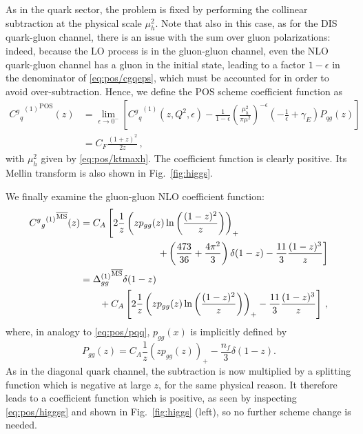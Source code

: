 As in the quark sector, the problem is fixed by performing the
collinear subtraction at the physical scale $\mu_h^2$. Note that
also in this case, as for the DIS quark-gluon channel,
there is an issue with the sum over gluon polarizations: indeed,
because the LO process is in the gluon-gluon channel, even the NLO
quark-gluon channel has a gluon in the initial state, leading
to a factor  $1-\epsilon$ in the 
denominator of \cref{eq:pos/cgqeps}, which must be accounted for in
order to avoid over-subtraction.
Hence, we define the POS scheme coefficient function as
\begin{align}\label{eq:pos/cqrenposh}
  {{C^g{}_q}^{(1)}}^{\textrm{POS}} (z)  &= \lim_{\epsilon\to0^-}
  \left[  {C^g{}_q}^{(1)}(z,Q^2,\epsilon) - \frac{1}{1-\epsilon}\left(\frac{\mu_h^2}{\pi\mu^2}\right)^{-\epsilon} \left(-\frac 1
    {\epsilon}+\gamma_E\right) P_{qg}(z)\right]\\ \label{eq:pos/cqrenposh1}
    &=C_F \frac{(1+z)^2}{2z} \, ,
\end{align}
with $\mu_h^2$ given by \cref{eq:pos/ktmaxh}.
The coefficient function is clearly positive. Its Mellin transform is
also shown in Fig.~\ref{fig:higgs}.

We finally examine the gluon-gluon NLO coefficient function:
\begin{align}
  \label{eq:pos/higgsg}
  {{C^g{}_g}^{(1)}}^{{\overline{\textrm{MS}}}} (z) 
  &=C_A\left[ 2\frac 1 z \left(z p_{gg}(z) \ln\left(\frac{(1-z)^2}{z}\right) \right)_+
    \right. \nonumber\\
    &\qquad\qquad\qquad\qquad \left.
      + \left(\frac{473}{36} + \frac{4\pi^2}{3}\right)\delta(1-z) -
      \frac{11}{3}\frac{(1-z)^3}{z} \right]\\
    &={\Delta^{(1)}_{gg}}^{{\overline{\textrm{MS}}}}\delta(1-z)
      \nonumber\\
      &\qquad
      + C_A \left[ 2\frac 1 z \left(z p_{gg}(z) \ln\left(\frac{(1-z)^2}{z}\right) \right)_+-
      \frac{11}{3}\frac{(1-z)^3}{z}\right] \,,
\end{align}
where, in analogy to \cref{eq:pos/pqq}, $p_{gg}(x)$ is implicitly
defined by
\begin{equation}\label{eq:pos/pgg}
  P_{gg}(z)= C_A\frac 1 z \left(z p_{gg}(z)\right)_+ - \frac{n_f}{3} \delta(1-z).
\end{equation}
As in the diagonal quark channel, the \msbar{} subtraction is now
multiplied by a splitting function which is negative at large $z$, for
the same physical reason. It therefore leads to a coefficient function
which is positive, as seen by inspecting \cref{eq:pos/higgsg} and
shown in Fig.~\ref{fig:higgs} (left), so no further scheme change is needed.

